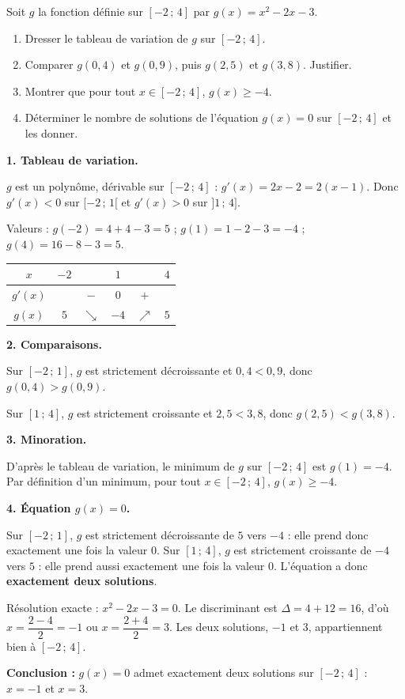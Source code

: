 \documentclass[11pt]{article}
\begin{document}
\begin{exoresolu}
Soit $g$ la fonction définie sur $[-2\,;\,4]$ par $g(x) = x^2 - 2x - 3$.
\begin{enumerate}
\item Dresser le tableau de variation de $g$ sur $[-2\,;\,4]$.
\item Comparer $g(0,4)$ et $g(0,9)$, puis $g(2,5)$ et $g(3,8)$. Justifier.
\item Montrer que pour tout $x \in [-2\,;\,4]$, $g(x) \geq -4$.
\item Déterminer le nombre de solutions de l'équation $g(x) = 0$ sur $[-2\,;\,4]$ et les donner.
\end{enumerate}
\tcblower
\textbf{1. Tableau de variation.}

$g$ est un polynôme, dérivable sur $[-2\,;\,4]$ : $g'(x) = 2x - 2 = 2(x-1)$. Donc $g'(x) < 0$ sur $[-2\,;\,1[$ et $g'(x) > 0$ sur $]1\,;\,4]$.

Valeurs : $g(-2) = 4 + 4 - 3 = 5$ ; $g(1) = 1 - 2 - 3 = -4$ ; $g(4) = 16 - 8 - 3 = 5$.

\begin{center}
\begin{tabular}{|c|ccccc|}
\hline
$x$ & $-2$ & & $1$ & & $4$ \\
\hline
$g'(x)$ & & $-$ & $0$ & $+$ & \\
\hline
$g(x)$ & $5$ & $\searrow$ & $-4$ & $\nearrow$ & $5$ \\
\hline
\end{tabular}
\end{center}

\textbf{2. Comparaisons.}

Sur $[-2\,;\,1]$, $g$ est strictement décroissante et $0,4 < 0,9$, donc $g(0,4) > g(0,9)$.

Sur $[1\,;\,4]$, $g$ est strictement croissante et $2,5 < 3,8$, donc $g(2,5) < g(3,8)$.

\textbf{3. Minoration.}

D'après le tableau de variation, le minimum de $g$ sur $[-2\,;\,4]$ est $g(1) = -4$. Par définition d'un minimum, pour tout $x \in [-2\,;\,4]$, $g(x) \geq -4$.

\textbf{4. Équation $g(x) = 0$.}

Sur $[-2\,;\,1]$, $g$ est strictement décroissante de $5$ vers $-4$ : elle prend donc exactement une fois la valeur $0$. Sur $[1\,;\,4]$, $g$ est strictement croissante de $-4$ vers $5$ : elle prend aussi exactement une fois la valeur $0$. L'équation a donc \textbf{exactement deux solutions}.

Résolution exacte : $x^2 - 2x - 3 = 0$. Le discriminant est $\Delta = 4 + 12 = 16$, d'où $x = \dfrac{2 - 4}{2} = -1$ ou $x = \dfrac{2+4}{2} = 3$. Les deux solutions, $-1$ et $3$, appartiennent bien à $[-2\,;\,4]$.

\textbf{Conclusion :} $g(x) = 0$ admet exactement deux solutions sur $[-2\,;\,4]$ : $x = -1$ et $x = 3$.
\end{exoresolu}
\end{document}

